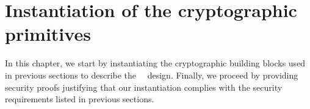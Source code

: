 
\chapter{Instantiation of the cryptographic primitives}\label{chap:instantiation}

In this chapter, we start by instantiating the cryptographic building blocks used in previous sections to describe the \zeth~\dapscheme~design. Finally, we proceed by providing security proofs justifying that our instantiation complies with the security requirements listed in previous sections.

